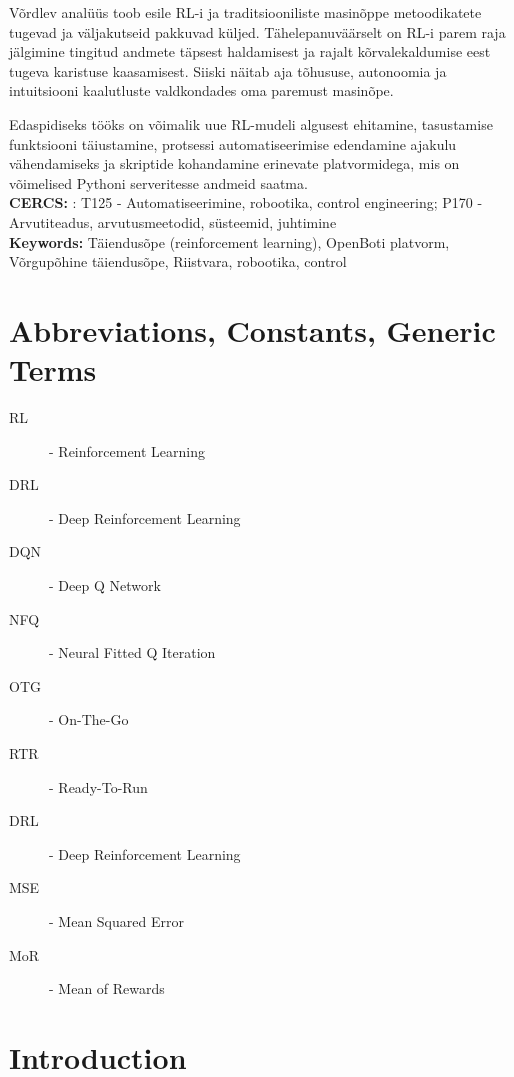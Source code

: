 \documentclass[12pt]{report}
\begin{document}
Võrdlev analüüs toob esile RL-i ja traditsiooniliste masinõppe metoodikatete tugevad ja väljakutseid pakkuvad küljed. Tähelepanuväärselt on RL-i parem raja jälgimine tingitud andmete täpsest haldamisest ja rajalt kõrvalekaldumise eest tugeva karistuse kaasamisest. Siiski näitab aja tõhususe, autonoomia ja intuitsiooni kaalutluste valdkondades oma paremust masinõpe.

Edaspidiseks tööks on võimalik uue RL-mudeli algusest ehitamine, tasustamise funktsiooni täiustamine, protsessi automatiseerimise edendamine ajakulu vähendamiseks ja skriptide kohandamine erinevate platvormidega, mis on võimelised Pythoni serveritesse andmeid saatma. \footnotemark{}
\\[5mm]
\textbf{CERCS:} : T125 - Automatiseerimine, robootika, control engineering; P170 - Arvutiteadus, arvutusmeetodid, süsteemid, juhtimine  
\\[5mm]
\textbf{Keywords:} Täiendusõpe (reinforcement learning), OpenBoti platvorm, Võrgupõhine täiendusõpe, Riistvara, robootika, control

\tableofcontents
\listoffigures

\chapter*{Abbreviations, Constants, Generic Terms}
\begin{description}
\item[RL] - Reinforcement Learning
\item[DRL] - Deep Reinforcement Learning 
\item[DQN] - Deep Q Network
\item[NFQ] - Neural Fitted Q Iteration
\item[OTG] - On-The-Go
\item[RTR] - Ready-To-Run
\item[DRL] - Deep Reinforcement Learning 
\item[MSE] - Mean Squared Error
\item[MoR] - Mean of Rewards


\end{description}
\chapter{Introduction}
\label{sub:Introduction}
\end{document}
